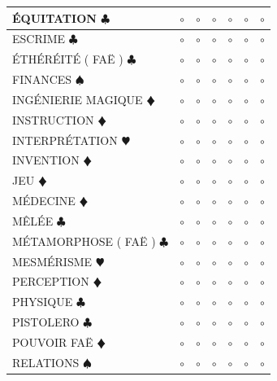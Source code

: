 \documentclass[a5paper]{letter}
\begin{document}
{{\begin{tabular}[c]{|p{}|p{}|p{}|p{}|p{}|p{}|p{}|}
	ÉQUITATION { $\clubsuit$ }							&	$\circ$	&	$\circ$	&	$\circ$	&	$\circ$	&	$\circ$		&	$\circ$		\\ \hline
	ESCRIME { $\clubsuit$ }								&	$\circ$	&	$\circ$	&	$\circ$	&	$\circ$	&	$\circ$		&	$\circ$		\\ \hline
	ÉTHÉRÉITÉ ( FAË ) { $\clubsuit$ }					&	$\circ$	&	$\circ$	&	$\circ$	&	$\circ$	&	$\circ$		&	$\circ$		\\ \hline
	FINANCES { $\spadesuit$ }							&	$\circ$	&	$\circ$	&	$\circ$	&	$\circ$	&	$\circ$		&	$\circ$		\\ \hline
	INGÉNIERIE MAGIQUE {\color{red} $\vardiamond$ }		&	$\circ$	&	$\circ$	&	$\circ$	&	$\circ$	&	$\circ$		&	$\circ$		\\ \hline
	INSTRUCTION {\color{red} $\vardiamond$ }			&	$\circ$	&	$\circ$	&	$\circ$	&	$\circ$	&	$\circ$		&	$\circ$		\\ \hline
	INTERPRÉTATION {\color{red} $\varheart$ }			&	$\circ$	&	$\circ$	&	$\circ$	&	$\circ$	&	$\circ$		&	$\circ$		\\ \hline
	INVENTION {\color{red} $\vardiamond$ }				&	$\circ$	&	$\circ$	&	$\circ$	&	$\circ$	&	$\circ$		&	$\circ$		\\ \hline
	JEU {\color{red} $\vardiamond$ }					&	$\circ$	&	$\circ$	&	$\circ$	&	$\circ$	&	$\circ$		&	$\circ$		\\ \hline
	MÉDECINE {\color{red} $\vardiamond$ }				&	$\circ$	&	$\circ$	&	$\circ$	&	$\circ$	&	$\circ$		&	$\circ$		\\ \hline
	MÊLÉE { $\clubsuit$ }								&	$\circ$	&	$\circ$	&	$\circ$	&	$\circ$	&	$\circ$		&	$\circ$		\\ \hline
	MÉTAMORPHOSE ( FAË ) { $\clubsuit$ }				&	$\circ$	&	$\circ$	&	$\circ$	&	$\circ$	&	$\circ$		&	$\circ$		\\ \hline
	MESMÉRISME {\color{red} $\varheart$ }				&	$\circ$	&	$\circ$	&	$\circ$	&	$\circ$	&	$\circ$		&	$\circ$		\\ \hline
	PERCEPTION {\color{red} $\vardiamond$ }				&	$\circ$	&	$\circ$	&	$\circ$	&	$\circ$	&	$\circ$		&	$\circ$		\\ \hline
	PHYSIQUE { $\clubsuit$ }							&	$\circ$	&	$\circ$	&	$\circ$	&	$\circ$	&	$\circ$		&	$\circ$		\\ \hline
	PISTOLERO { $\clubsuit$ }							&	$\circ$	&	$\circ$	&	$\circ$	&	$\circ$	&	$\circ$		&	$\circ$		\\ \hline
	POUVOIR FAË {\color{red} $\vardiamond$ }			&	$\circ$	&	$\circ$	&	$\circ$	&	$\circ$	&	$\circ$		&	$\circ$		\\ \hline
	RELATIONS { $\spadesuit$ }							&	$\circ$	&	$\circ$	&	$\circ$	&	$\circ$	&	$\circ$		&	$\circ$		\\ \hline

\end{tabular}}}
\end{document}
